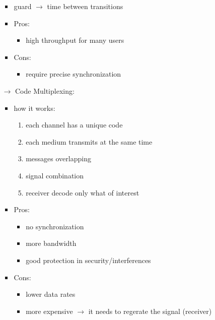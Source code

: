 \begin{itemize}
\begin{itemize}
\begin{itemize}
            \item guard $\rightarrow$ time between transitions
            \item Pros:
            \begin{itemize}
                \item high throughput for many users
            \end{itemize}
            \item Cons:
            \begin{itemize}
                \item require precise synchronization
            \end{itemize}
        \end{itemize}
        \item[$\rightarrow$] Code Multiplexing:
        \begin{itemize}
            \item how it works:
            \begin{enumerate}
                \item each channel has a unique code
                \item each medium transmits at the same time
                \item messages overlapping
                \item signal combination
                \item receiver decode only what of interest
            \end{enumerate}
            \item Pros:
            \begin{itemize}
                \item no synchronization
                \item more bandwidth
                \item good protection in security/interferences
            \end{itemize}
            \item Cons:
            \begin{itemize}
                \item lower data rates
                \item more expensive $\rightarrow$ it needs to regerate the signal (receiver) 
            \end{itemize}
        \end{itemize}
    \end{itemize}
\end{itemize}
\newpage
